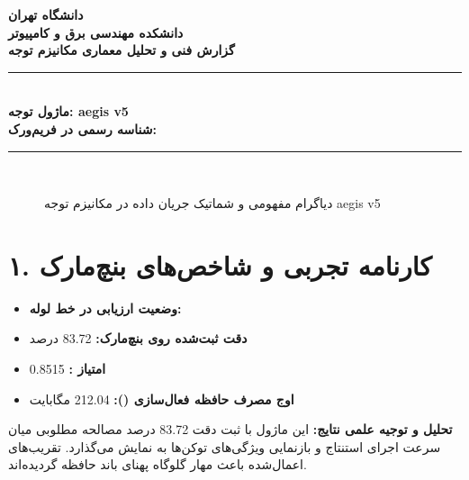 \documentclass[12pt,a4paper]{article}
\begin{document}
\begin{center}
{\Large\bfseries دانشگاه تهران}\\[0.2cm]
{\large\bfseries دانشکده مهندسی برق و کامپیوتر}\\[0.2cm]
{\large\bfseries گزارش فنی و تحلیل معماری مکانیزم توجه}\\[0.5cm]
\rule{\linewidth}{1pt}\\[0.3cm]
{\LARGE\bfseries ماژول توجه: aegis v5}\\[0.2cm]
{\large \textbf{شناسه رسمی در فریم‌ورک:} }\\[0.2cm]
\rule{\linewidth}{1pt}\\[0.5cm]
\end{center}

\begin{figure}[H]
\centering
{}
\caption{دیاگرام مفهومی و شماتیک جریان داده در مکانیزم توجه aegis v5}
\end{figure}

\section*{۱. کارنامه تجربی و شاخص‌های بنچ‌مارک}
\begin{itemize}
\item \textbf{وضعیت ارزیابی در خط لوله:} 
\item \textbf{دقت ثبت‌شده روی بنچ‌مارک:} 83.72 درصد
\item \textbf{امتیاز :} 0.8515
\item \textbf{اوج مصرف حافظه فعال‌سازی ():} 212.04 مگابایت
\end{itemize}
\textbf{تحلیل و توجیه علمی نتایج:} این ماژول با ثبت دقت 83.72 درصد مصالحه مطلوبی میان سرعت اجرای استنتاج و بازنمایی ویژگی‌های توکن‌ها به نمایش می‌گذارد. تقریب‌های اعمال‌شده باعث مهار گلوگاه پهنای باند حافظه گردیده‌اند.
\end{document}
